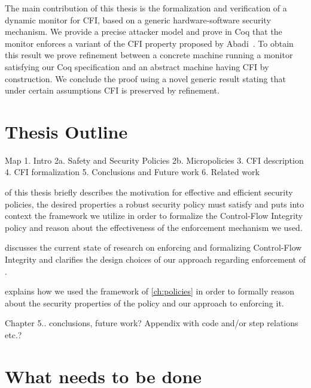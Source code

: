 The main contribution of this thesis is the formalization and
verification of a dynamic monitor for CFI, based on a generic
hardware-software security mechanism.
%
We provide a precise attacker model and prove in Coq that the monitor
enforces a variant of the CFI property proposed by
Abadi~\ETAL\cite{AbadiBEL09}.
%
To obtain this result we prove refinement between a concrete
machine running a monitor satisfying our Coq specification
and an abstract machine having CFI by construction.
%
We conclude the proof using a novel generic result stating that under
certain assumptions CFI is preserved by refinement.

\section{Thesis Outline}\label{sec:outline}
Map
1. Intro
2a. Safety and Security Policies
2b. Micropolicies
3. CFI description
4. CFI formalization
5. Conclusions and Future work
6. Related work

 of this thesis briefly describes the motivation for
effective and efficient security policies, the desired properties a
robust security policy must satisfy and puts into context the
framework we utilize in order to formalize the Control-Flow Integrity policy
and reason about the effectiveness of the enforcement mechanism we used.

 discusses the current state of
research on enforcing and formalizing Control-Flow Integrity and clarifies
the design choices of our approach regarding enforcement of \CFI.

 explains how we used the framework of \cref{ch:policies}
in order to formally reason about the security properties of the \CFI policy and
our approach to enforcing it. 

Chapter 5.. conclusions, future work? Appendix with code and/or step
relations etc.?

\section{What needs to be done}

